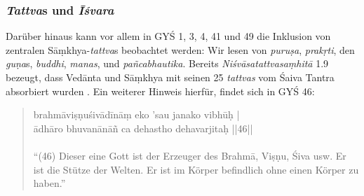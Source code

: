 \documentclass[a4paper,12pt]{article}
\begin{document}
\subsubsection{\textit{Tattva}s und \textit{Īśvara}}

      Darüber hinaus kann vor allem in GYŚ 1, 3, 4, 41 und 49 die Inklusion von zentralen Sāṃkhya-\textit{tattva}s beobachtet werden: Wir lesen von \textit{puruṣa}, \textit{prakṛti}, den \textit{guṇa}s, \textit{buddhi}, \textit{manas}, und \textit{pañcabhautika}. Bereits \textit{Niśvāsatattvasaṃhitā} 1.9 bezeugt, dass Vedānta und Sāṃkhya mit seinen 25 \textit{tattvas} vom Śaiva Tantra absorbiert wurden \parencite[137]{nishvasa2015}. Ein weiterer Hinweis hierfür, findet sich in GYŚ 46:
\begin{quote}
  brahmāviṣṇuśivādīnāṃ eko ’sau janako vibhūḥ |\\
  ādhāro bhuvanānāñ ca dehastho dehavarjitaḥ ||46||\\ \\
  ``(46) Dieser eine Gott ist der Erzeuger des Brahmā, Viṣṇu, Śiva usw. Er ist die Stütze der Welten. Er ist im Körper befindlich ohne einen Körper zu haben.''\\
\end{quote}
\end{document}
